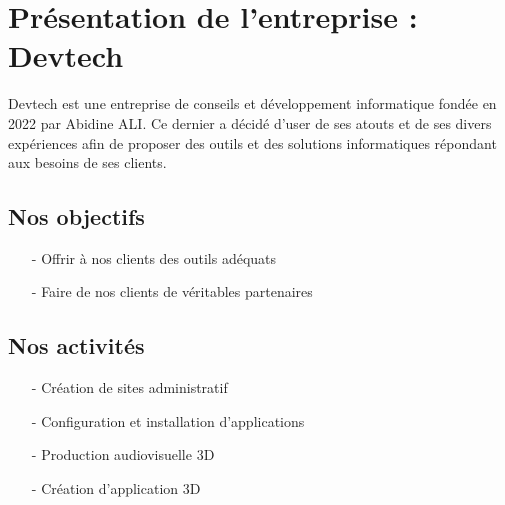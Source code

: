 \section{Présentation de l'entreprise : Devtech}
Devtech est une entreprise de conseils et développement informatique fondée en 2022 par Abidine ALI. Ce dernier a décidé d'user de ses atouts et de ses divers expériences afin de proposer des outils et des solutions informatiques répondant aux besoins de ses clients.
\subsection*{Nos objectifs}
\begin{itemize}
\item[-] Offrir à nos clients des outils adéquats  
\item[-] Faire de nos clients de véritables partenaires
\end{itemize}
\subsection*{Nos activités}
\begin{itemize}
\item[-] Création de sites administratif
\item[-] Configuration et installation d'applications 
\item[-] Production audiovisuelle 3D
\item[-] Création d'application 3D
\end{itemize}
